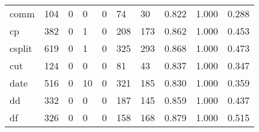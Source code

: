 \begin{longtable}{lp{1.3cm}p{1.3cm}p{1.3cm}p{1.3cm}p{1.3cm}p{1.3cm}p{1.3cm}p{1.3cm}p{1.3cm}}
comm      &                    104 &                                             0 &                                            0 &                                           0 &                                           74 &                                         30 &                                0.822 &                                  1.000 &                                0.288 \\
cp        &                    382 &                                             0 &                                            1 &                                           0 &                                          208 &                                        173 &                                0.862 &                                  1.000 &                                0.453 \\
csplit    &                    619 &                                             0 &                                            1 &                                           0 &                                          325 &                                        293 &                                0.868 &                                  1.000 &                                0.473 \\
cut       &                    124 &                                             0 &                                            0 &                                           0 &                                           81 &                                         43 &                                0.837 &                                  1.000 &                                0.347 \\
date      &                    516 &                                             0 &                                           10 &                                           0 &                                          321 &                                        185 &                                0.830 &                                  1.000 &                                0.359 \\
dd        &                    332 &                                             0 &                                            0 &                                           0 &                                          187 &                                        145 &                                0.859 &                                  1.000 &                                0.437 \\
df        &                    326 &                                             0 &                                            0 &                                           0 &                                          158 &                                        168 &                                0.879 &                                  1.000 &                                0.515 \\

\end{longtable}
